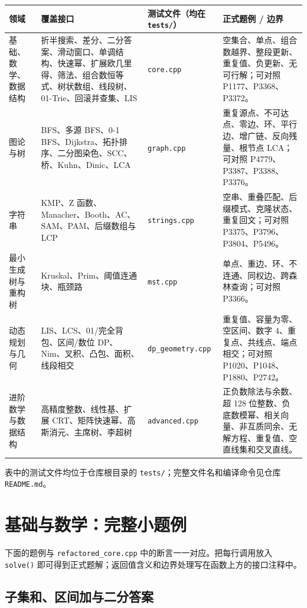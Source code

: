 \small
\setlength{\tabcolsep}{2pt}
\begin{longtable}[]{@{}p{}p{}p{}p{}@{}}
\toprule
领域 & 覆盖接口 & 测试文件（均在 \texttt{tests/}） & 正式题例 / 边界 \\
\midrule
\endhead
\bottomrule
\endlastfoot
基础、数学、数据结构 &
折半搜索、差分、二分答案、滑动窗口、单调结构、快速幂、扩展欧几里得、筛法、组合数恒等式、树状数组、线段树、01-Trie、回滚并查集、LIS &
\texttt{core.cpp} &
空集合、单点、组合数越界、整段更新、重复值、负更新、无可行解；可对照 P1177、P3368、P3372。\\
图论与树 &
BFS、多源 BFS、0-1 BFS、Dijkstra、拓扑排序、二分图染色、SCC、桥、Kuhn、Dinic、LCA &
\texttt{graph.cpp} &
重复源点、不可达点、零边、环、平行边、增广链、反向残量、根节点 LCA；可对照 P4779、P3387、P3388、P3376。\\
字符串 &
KMP、Z 函数、Manacher、Booth、AC、SAM、PAM、后缀数组与 LCP &
\texttt{strings.cpp} &
空串、重叠匹配、后缀模式、克隆状态、重复回文；可对照 P3375、P3796、P3804、P5496。\\
最小生成树与重构树 &
Kruskal、Prim、阈值连通块、瓶颈路 &
\texttt{mst.cpp} &
单点、重边、环、不连通、同权边、跨森林查询；可对照 P3366。\\
动态规划与几何 &
LIS、LCS、01/完全背包、区间/数位 DP、Nim、叉积、凸包、面积、线段相交 &
\texttt{dp\_geometry.cpp} &
重复值、容量为零、空区间、数字 4、重复点、共线点、端点相交；可对照 P1020、P1048、P1880、P2742。\\
进阶数学与数据结构 &
高精度整数、线性基、扩展 CRT、矩阵快速幂、高斯消元、主席树、李超树 &
\texttt{advanced.cpp} &
正负数除法与余数、超 128 位整数、负底数模幂、相关向量、非互质同余、无解方程、重复值、空直线集和交叉直线。\\
\end{longtable}
\normalsize

表中的测试文件均位于仓库根目录的 \texttt{tests/}；完整文件名和编译命令见仓库
\texttt{README.md}。

\section{基础与数学：完整小题例}

下面的题例与 \texttt{refactored\_core.cpp} 中的断言一一对应。把每行调用放入
\texttt{solve()} 即可得到正式题解；返回值含义和边界处理写在函数上方的接口注释中。

\subsection{子集和、区间加与二分答案}

